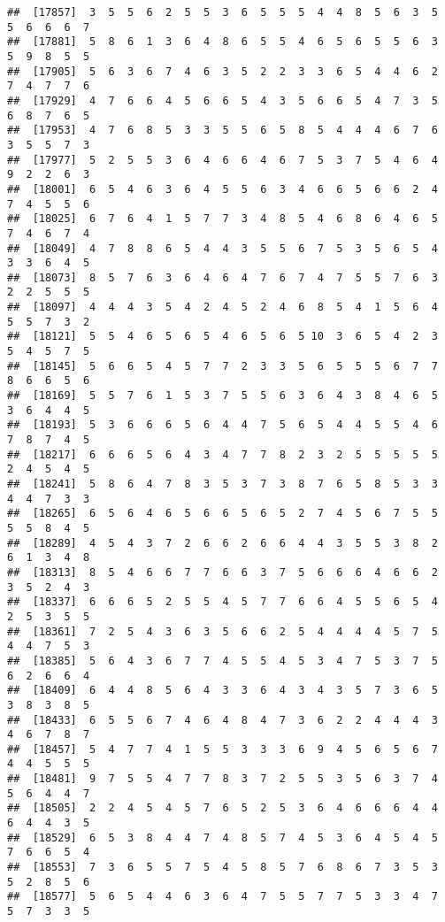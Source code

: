 \documentclass[
]{book}
\begin{document}
\begin{verbatim}
##  [17857]  3  5  5  6  2  5  5  3  6  5  5  5  4  4  8  5  6  3  5  5  6  6  6  7
##  [17881]  5  8  6  1  3  6  4  8  6  5  5  4  6  5  6  5  5  6  3  5  9  8  5  5
##  [17905]  5  6  3  6  7  4  6  3  5  2  2  3  3  6  5  4  4  6  2  7  4  7  7  6
##  [17929]  4  7  6  6  4  5  6  6  5  4  3  5  6  6  5  4  7  3  5  6  8  7  6  5
##  [17953]  4  7  6  8  5  3  3  5  5  6  5  8  5  4  4  4  6  7  6  3  5  5  7  3
##  [17977]  5  2  5  5  3  6  4  6  6  4  6  7  5  3  7  5  4  6  4  9  2  2  6  3
##  [18001]  6  5  4  6  3  6  4  5  5  6  3  4  6  6  5  6  6  2  4  7  4  5  5  6
##  [18025]  6  7  6  4  1  5  7  7  3  4  8  5  4  6  8  6  4  6  5  7  4  6  7  4
##  [18049]  4  7  8  8  6  5  4  4  3  5  5  6  7  5  3  5  6  5  4  3  3  6  4  5
##  [18073]  8  5  7  6  3  6  4  6  4  7  6  7  4  7  5  5  7  6  3  2  2  5  5  5
##  [18097]  4  4  4  3  5  4  2  4  5  2  4  6  8  5  4  1  5  6  4  5  5  7  3  2
##  [18121]  5  5  4  6  5  6  5  4  6  5  6  5 10  3  6  5  4  2  3  5  4  5  7  5
##  [18145]  5  6  6  5  4  5  7  7  2  3  3  5  6  5  5  5  6  7  7  8  6  6  5  6
##  [18169]  5  5  7  6  1  5  3  7  5  5  6  3  6  4  3  8  4  6  5  3  6  4  4  5
##  [18193]  5  3  6  6  6  5  6  4  4  7  5  6  5  4  4  5  5  4  6  7  8  7  4  5
##  [18217]  6  6  6  5  6  4  3  4  7  7  8  2  3  2  5  5  5  5  5  2  4  5  4  5
##  [18241]  5  8  6  4  7  8  3  5  3  7  3  8  7  6  5  8  5  3  3  4  4  7  3  3
##  [18265]  6  5  6  4  6  5  6  6  5  6  5  2  7  4  5  6  7  5  5  5  5  8  4  5
##  [18289]  4  5  4  3  7  2  6  6  2  6  6  4  4  3  5  5  3  8  2  6  1  3  4  8
##  [18313]  8  5  4  6  6  7  7  6  6  3  7  5  6  6  6  4  6  6  2  3  5  2  4  3
##  [18337]  6  6  6  5  2  5  5  4  5  7  7  6  6  4  5  5  6  5  4  2  5  3  5  5
##  [18361]  7  2  5  4  3  6  3  5  6  6  2  5  4  4  4  4  5  7  5  4  4  7  5  3
##  [18385]  5  6  4  3  6  7  7  4  5  5  4  5  3  4  7  5  3  7  5  6  2  6  6  4
##  [18409]  6  4  4  8  5  6  4  3  3  6  4  3  4  3  5  7  3  6  5  3  8  3  8  5
##  [18433]  6  5  5  6  7  4  6  4  8  4  7  3  6  2  2  4  4  4  3  4  6  7  8  7
##  [18457]  5  4  7  7  4  1  5  5  3  3  3  6  9  4  5  6  5  6  7  4  4  5  5  5
##  [18481]  9  7  5  5  4  7  7  8  3  7  2  5  5  3  5  6  3  7  4  5  6  4  4  7
##  [18505]  2  2  4  5  4  5  7  6  5  2  5  3  6  4  6  6  6  4  4  6  4  4  3  5
##  [18529]  6  5  3  8  4  4  7  4  8  5  7  4  5  3  6  4  5  4  5  7  6  6  5  4
##  [18553]  7  3  6  5  5  7  5  4  5  8  5  7  6  8  6  7  3  5  3  5  2  8  5  6
##  [18577]  5  6  5  4  4  6  3  6  4  7  5  5  7  7  5  3  3  4  7  5  7  3  3  5

\end{verbatim}
\end{document}
